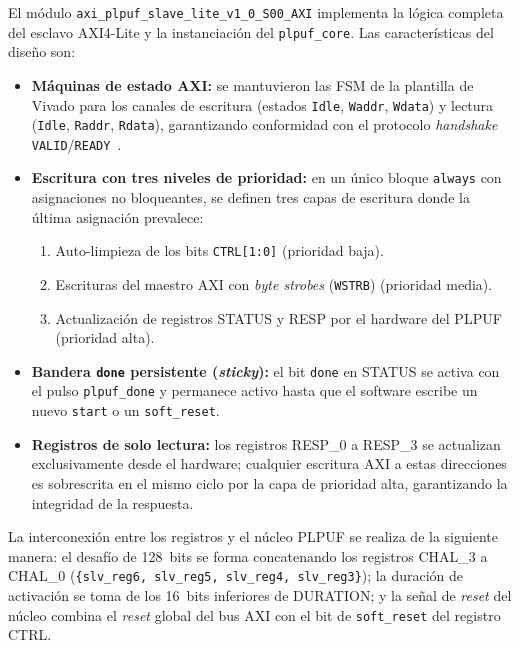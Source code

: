 El módulo \texttt{axi\_plpuf\_slave\_lite\_v1\_0\_S00\_AXI} implementa la
lógica completa del esclavo AXI4-Lite y la instanciación del
\texttt{plpuf\_core}. Las características del diseño son:

\begin{itemize}
  \item \textbf{Máquinas de estado AXI:} se mantuvieron las FSM de la
    plantilla de Vivado para los canales de escritura (estados \texttt{Idle},
    \texttt{Waddr}, \texttt{Wdata}) y lectura (\texttt{Idle}, \texttt{Raddr},
    \texttt{Rdata}), garantizando conformidad con el protocolo
    \textit{handshake} \texttt{VALID}/\texttt{READY}~\cite{ihi0022h}.

  \item \textbf{Escritura con tres niveles de prioridad:} en un único bloque
    \texttt{always} con asignaciones no bloqueantes, se definen tres capas de
    escritura donde la última asignación prevalece:
    \begin{enumerate}
      \item Auto-limpieza de los bits \texttt{CTRL[1:0]} (prioridad baja).
      \item Escrituras del maestro AXI con \textit{byte strobes}
        (\texttt{WSTRB}) (prioridad media).
      \item Actualización de registros STATUS y RESP por el hardware del
        PLPUF (prioridad alta).
    \end{enumerate}

  \item \textbf{Bandera \texttt{done} persistente (\textit{sticky}):} el bit
    \texttt{done} en STATUS se activa con el pulso \texttt{plpuf\_done} y
    permanece activo hasta que el software escribe un nuevo \texttt{start} o
    un \texttt{soft\_reset}.

  \item \textbf{Registros de solo lectura:} los registros RESP\_0 a RESP\_3
    se actualizan exclusivamente desde el hardware; cualquier escritura AXI a
    estas direcciones es sobrescrita en el mismo ciclo por la capa de
    prioridad alta, garantizando la integridad de la respuesta.
\end{itemize}

La interconexión entre los registros y el núcleo PLPUF se realiza de la
siguiente manera: el desafío de 128~bits se forma concatenando los registros
CHAL\_3 a CHAL\_0 (\texttt{\{slv\_reg6, slv\_reg5, slv\_reg4, slv\_reg3\}});
la duración de activación se toma de los 16~bits inferiores de DURATION; y la
señal de \textit{reset} del núcleo combina el \textit{reset} global del bus
AXI con el bit de \texttt{soft\_reset} del registro CTRL.

